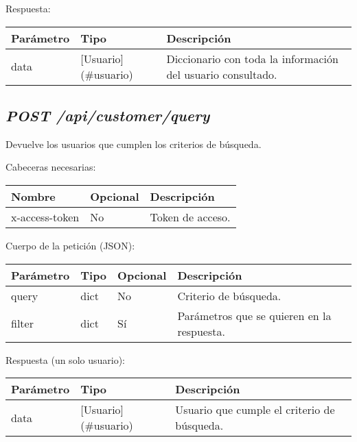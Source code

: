 Respuesta:
\begin{table}[h!]
	\centering
	\begin{adjustbox}{max width=\textwidth}
	\begin{tabular}{|l|l|l|}
		\hline
		Parámetro & Tipo & Descripción \\ \hline
		data & [Usuario](\#usuario) & Diccionario con toda la información del usuario consultado. \\ \hline
	\end{tabular}
\end{adjustbox}
\end{table}



\subsection{\textit{POST /api/customer/query}}
Devuelve los usuarios que cumplen los criterios de búsqueda.

Cabeceras necesarias:
\begin{table}[h!]
	\centering
	\begin{adjustbox}{max width=\textwidth}
	\begin{tabular}{|l|l|l|}
		\hline
		Nombre & Opcional & Descripción \\ \hline
		x-access-token & No & Token de acceso. \\ \hline
	\end{tabular}
\end{adjustbox}
\end{table}


Cuerpo de la petición (JSON):
\begin{table}[h!]
	\centering
	\begin{adjustbox}{max width=\textwidth}
	\begin{tabular}{|l|l|l|l|}
		\hline
		Parámetro & Tipo & Opcional & Descripción \\ \hline
		query & dict & No & Criterio de búsqueda. \\ \hline
		filter & dict & Sí & Parámetros que se quieren en la respuesta. \\ \hline
	\end{tabular}
\end{adjustbox}
\end{table}

Respuesta (un solo usuario):
\begin{table}[h!]
	\centering
	\begin{adjustbox}{max width=\textwidth}
	\begin{tabular}{|l|l|l|}
		\hline
		Parámetro & Tipo & Descripción \\ \hline
		data & [Usuario](\#usuario) & Usuario que cumple el criterio de búsqueda. \\ \hline
	\end{tabular}
\end{adjustbox}
\end{table}

